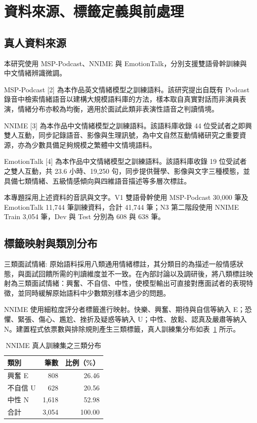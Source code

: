 
\section{資料來源、標籤定義與前處理}

\subsection{真人資料來源}
本研究使用 MSP-Podcast、NNIME 與 EmotionTalk，分別支援雙語骨幹訓練與中文情緒辨識微調。

MSP-Podcast [2] 為本作品英文情緒模型之訓練語料。該研究提出自既有 Podcast 錄音中檢索情緒語音以建構大規模語料庫的方法，樣本取自真實對話而非演員表演，情緒分布亦較為均衡，適用於面試此類非表演性語音之判讀情境。

NNIME [3] 為本作品中文情緒模型之訓練語料。該語料庫收錄 44 位受試者之即興雙人互動，同步記錄語音、影像與生理訊號，為中文自然互動情緒研究之重要資源，亦為少數具備足夠規模之繁體中文情境語料。

EmotionTalk [4] 為本作品中文情緒模型之訓練語料。該語料庫收錄 19 位受試者之雙人互動，共 23.6 小時、19,250 句，同步提供聲學、影像與文字三種模態，並具備七類情緒、五級情感傾向與四維語音描述等多層次標註。

本專題採用上述資料的音訊與文字。V1 雙語骨幹使用 MSP-Podcast 30,000 筆及 EmotionTalk 11,744 筆訓練資料，合計 41,744 筆；N3 第二階段使用 NNIME Train 3,054 筆，Dev 與 Test 分別為 608 與 638 筆。


\subsection{標籤映射與類別分布}
三類面試情緒: 原始語料採用八類通用情緒標註，其分類目的為描述一般情感狀態，與面試回饋所需的判讀維度並不一致。在內部討論以及調研後，將八類標註映射為三類面試情緒：興奮、不自信、中性，使模型輸出可直接對應面試者的表現特徵，並同時緩解原始語料中少數類別樣本過少的問題。

NNIME 使用細粒度評分者標籤進行映射。快樂、興奮、期待與自信等納入 E；恐懼、緊張、傷心、尷尬、挫折及疑惑等納入 U；中性、放鬆、認真及嚴肅等納入 N。建置程式依票數與排除規則產生三類標籤，真人訓練集分布如表~\ref{tab:class_distribution} 所示。

\begin{table}[htbp]
\centering
\caption{NNIME 真人訓練集之三類分布}
\label{tab:class_distribution}
\begin{tabular}{lrr}
\toprule
類別 & 筆數 & 比例（\%）\\
\midrule
興奮 E & 808 & 26.46\\
不自信 U & 628 & 20.56\\
中性 N & 1,618 & 52.98\\
\midrule
合計 & 3,054 & 100.00\\
\bottomrule
\end{tabular}
\end{table}

